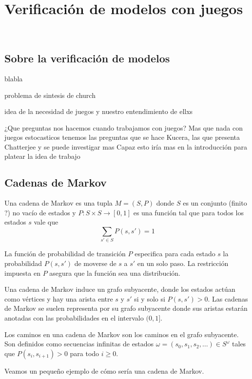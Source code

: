 \chapter{Verificación de modelos con juegos}
~\label{cap:approach}

\section{Sobre la verificación de modelos}

blabla

problema de sintesis de church

idea de la necesidad de juegos y nuestro entendimiento de ellxs

¿Que preguntas nos hacemos cuando trabajamos con juegos? Mas que nada con juegos estocasticos
tenemos las preguntas que se hace Kucera, las que presenta Chatterjee y se puede investigar mas
Capaz esto iría mas en la introducción para platear la idea de trabajo

\section{Cadenas de Markov}

\begin{definition}
	Una cadena de Markov es una tupla $M = (S, P)$ donde $S$ es un conjunto (finito ?) no vacío de estados y $P: S \times S \rightarrow [0,1]$ es una función tal que para todos los estados $s$ vale que
	$$ \sum_{s' \in S} P(s, s') = 1$$
\end{definition}

La función de probabilidad de transición $P$ especifica para cada estado $s$ la
probabilidad $P(s, s')$ de moverse de $s$ a $s'$ en un solo paso. La
restricción impuesta en $P$ asegura que la función sea una distribución.

Una cadena de Markov induce un grafo subyacente, donde los estados actúan como
vértices y hay una arista entre $s$ y $s'$ si y solo si $P(s, s') > 0$. Las
cadenas de Markov se suelen representa por su grafo subyacente donde sus
aristas estarán anotadas con las probabilidades en el intervalo $(0, 1]$.

Los caminos en una cadena de Markov son los caminos en el grafo subyacente. Son
definidos como secuencias infinitas de estados $\omega = (s_0, s_1, s_2, \dots)
	\in S^\omega$ tales que $P(s_i, s_{i+1}) > 0 $ para todo $i \geq 0$.

Veamos un pequeño ejemplo de cómo sería una cadena de Markov.

